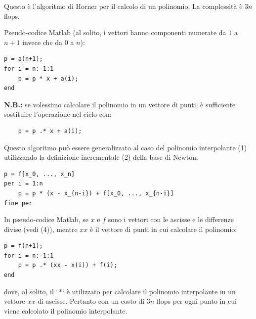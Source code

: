 Questo è l'algoritmo di Horner per il calcolo di un polinomio. La complessità è $3n$ flops.

Pseudo-codice Matlab (al solito, i vettori hanno componenti numerate da $1$ a $n+1$ invece che da $0$ a $n$):
\begin{verbatim}
p = a(n+1);
for i = n:-1:1
    p = p * x + a(i);
end
\end{verbatim}

\textbf{N.B.:} se volessimo calcolare il polinomio in un vettore di punti, è sufficiente sostituire l'operazione nel ciclo con:
\begin{verbatim}
    p = p .* x + a(i);
\end{verbatim}

Questo algoritmo può essere generalizzato al caso del polinomio interpolante (1) utilizzando la definizione incrementale (2) della base di Newton.

\begin{verbatim}
p = f[x_0, ..., x_n]
per i = 1:n
    p = p * (x - x_{n-i}) + f[x_0, ..., x_{n-i}]
fine per
\end{verbatim}

In pseudo-codice Matlab, se $x$ e $f$ sono i vettori con le ascisse e le differenze divise (vedi (4)), mentre $xx$ è il vettore di punti in cui calcolare il polinomio:

\begin{verbatim}
p = f(n+1);
for i = n:-1:1
    p = p .* (xx - x(i)) + f(i);
end
\end{verbatim}

dove, al solito, il `.*` è utilizzato per calcolare il polinomio interpolante in un vettore $xx$ di ascisse. Pertanto con un costo di $3n$ flops per ogni punto in cui viene calcolato il polinomio interpolante.

\vspace{1cm}

